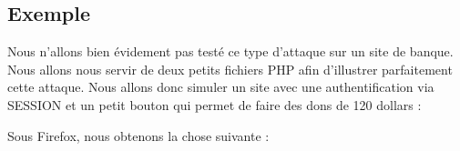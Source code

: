 \documentclass{article}
\begin{document}
\subsection{Exemple}

Nous n'allons bien évidement pas testé ce type d'attaque sur un site de banque. Nous allons nous servir de deux petits fichiers PHP afin d'illustrer parfaitement cette attaque. Nous allons donc simuler un site avec une authentification via SESSION et un petit bouton qui permet de faire des dons de 120 dollars :
\vspace{0.2cm}\\
\vspace{0.2cm}

Sous Firefox, nous obtenons la chose suivante :
\vspace{0.2cm}\\
\vspace{0.2cm}
\end{document}
